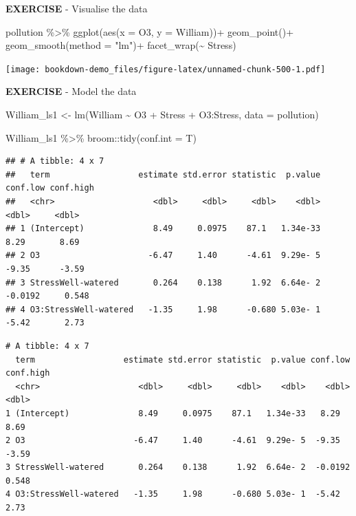 \documentclass[
]{book}
\newenvironment{Shaded}{\begin{snugshade}}{\end{snugshade}}
\newcommand{\AttributeTok}[1]{\textcolor[rgb]{0.77,0.63,0.00}{#1}}
\newcommand{\FunctionTok}[1]{\textcolor[rgb]{0.00,0.00,0.00}{#1}}
\newcommand{\NormalTok}[1]{#1}
\newcommand{\OtherTok}[1]{\textcolor[rgb]{0.56,0.35,0.01}{#1}}
\newcommand{\SpecialCharTok}[1]{\textcolor[rgb]{0.00,0.00,0.00}{#1}}
\newcommand{\StringTok}[1]{\textcolor[rgb]{0.31,0.60,0.02}{#1}}
\begin{document}
\textbf{EXERCISE} - Visualise the data

\begin{Shaded}
\begin{Highlighting}[]
\NormalTok{pollution }\SpecialCharTok{\%\textgreater{}\%} 
  \FunctionTok{ggplot}\NormalTok{(}\FunctionTok{aes}\NormalTok{(}\AttributeTok{x =}\NormalTok{ O3, }\AttributeTok{y =}\NormalTok{ William))}\SpecialCharTok{+}
  \FunctionTok{geom\_point}\NormalTok{()}\SpecialCharTok{+}
  \FunctionTok{geom\_smooth}\NormalTok{(}\AttributeTok{method =} \StringTok{"lm"}\NormalTok{)}\SpecialCharTok{+}
  \FunctionTok{facet\_wrap}\NormalTok{(}\SpecialCharTok{\textasciitilde{}}\NormalTok{ Stress)}
\end{Highlighting}
\end{Shaded}

\texttt{[image: bookdown-demo\_files/figure-latex/unnamed-chunk-500-1.pdf]}

\textbf{EXERCISE} - Model the data

\begin{Shaded}
\begin{Highlighting}[]
\NormalTok{William\_ls1 }\OtherTok{\textless{}{-}} \FunctionTok{lm}\NormalTok{(William }\SpecialCharTok{\textasciitilde{}}\NormalTok{ O3 }\SpecialCharTok{+}\NormalTok{ Stress }\SpecialCharTok{+}\NormalTok{ O3}\SpecialCharTok{:}\NormalTok{Stress, }\AttributeTok{data =}\NormalTok{ pollution)}

\NormalTok{William\_ls1 }\SpecialCharTok{\%\textgreater{}\%} 
\NormalTok{    broom}\SpecialCharTok{::}\FunctionTok{tidy}\NormalTok{(}\AttributeTok{conf.int =}\NormalTok{ T)}
\end{Highlighting}
\end{Shaded}

\begin{verbatim}
## # A tibble: 4 x 7
##   term                  estimate std.error statistic  p.value conf.low conf.high
##   <chr>                    <dbl>     <dbl>     <dbl>    <dbl>    <dbl>     <dbl>
## 1 (Intercept)              8.49     0.0975    87.1   1.34e-33   8.29       8.69 
## 2 O3                      -6.47     1.40      -4.61  9.29e- 5  -9.35      -3.59 
## 3 StressWell-watered       0.264    0.138      1.92  6.64e- 2  -0.0192     0.548
## 4 O3:StressWell-watered   -1.35     1.98      -0.680 5.03e- 1  -5.42       2.73
\end{verbatim}

\begin{verbatim}
# A tibble: 4 x 7
  term                  estimate std.error statistic  p.value conf.low conf.high
  <chr>                    <dbl>     <dbl>     <dbl>    <dbl>    <dbl>     <dbl>
1 (Intercept)              8.49     0.0975    87.1   1.34e-33   8.29       8.69 
2 O3                      -6.47     1.40      -4.61  9.29e- 5  -9.35      -3.59 
3 StressWell-watered       0.264    0.138      1.92  6.64e- 2  -0.0192     0.548
4 O3:StressWell-watered   -1.35     1.98      -0.680 5.03e- 1  -5.42       2.73 
\end{verbatim}
\end{document}
